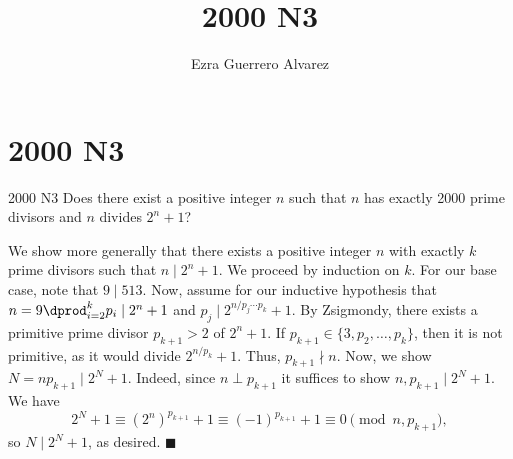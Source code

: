 \documentclass[14pt]{article}
\title{2000 N3}
\author{Ezra Guerrero Alvarez}
\begin{document}
\maketitle
	
\section*{2000 N3}

\begin{statement}{2000 N3}
	Does there exist a positive integer $n$ such that $n$ has exactly 2000 prime divisors and $n$ divides $2^n + 1$?
\end{statement}
We show more generally that there exists a positive integer $n$ with exactly $k$ prime divisors such that $n\mid 2^n+1$. We proceed by induction on $k$. For our base case, note that $9\mid 513$. Now, assume for our inductive hypothesis that $n=9\dprod_{i=2}^k p_i\mid 2^n+1$ and $p_j\mid 2^{n/p_j\cdots p_k}+1$. By Zsigmondy, there exists a primitive prime divisor $p_{k+1}>2$ of $2^n+1$. If $p_{k+1}\in\{3,p_2,\ldots,p_k\}$, then it is not primitive, as it would divide $2^{n/p_k}+1$. Thus, $p_{k+1}\nmid n$. Now, we show $N=np_{k+1}\mid 2^N+1$. Indeed, since $n\perp p_{k+1}$ it suffices to show $n,p_{k+1}\mid 2^N+1$. We have
\[ 2^N+1\equiv (2^n)^{p_{k+1}}+1\equiv (-1)^{p_{k+1}}+1\equiv 0\pmod{n,p_{k+1}}, \]
so $N\mid 2^N+1$, as desired. $\blacksquare$
	
\end{document}

